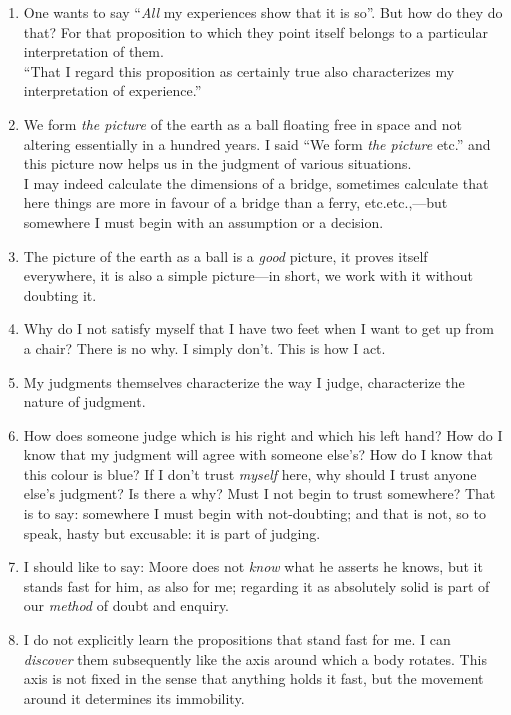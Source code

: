 \documentclass{book}
\begin{document}
\begin{enumerate}
\item
One wants to say ``\emph{All} my experiences show that it is so''. But how do
they do that? For that proposition to which they point itself belongs to a
particular interpretation of them. \\
``That I regard this proposition as certainly true also characterizes my
interpretation of experience.''

\item
We form \emph{the picture} of the earth as a ball floating free in space and
not altering essentially in a hundred years. I said ``We form \emph{the
picture} etc.'' and this picture now helps us in the judgment of various
situations. \\
I may indeed calculate the dimensions of a bridge, sometimes calculate that
here things are more in favour of a bridge than a ferry, etc.etc.,---but
somewhere I must begin with an assumption or a decision.

\item
The picture of the earth as a ball is a \emph{good} picture, it proves itself
everywhere, it is also a simple picture---in short, we work with it without
doubting it.

\item
Why do I not satisfy myself that I have two feet when I want to get up from a
chair? There is no why. I simply don't. This is how I act.

\item
My judgments themselves characterize the way I judge, characterize the nature
of judgment.

\item
How does someone judge which is his right and which his left hand? How do I
know that my judgment will agree with someone else's? How do I know that this
colour is blue? If I don't trust \emph{myself} here, why should I trust anyone
else's judgment? Is there a why? Must I not begin to trust somewhere? That is
to say: somewhere I must begin with not-doubting; and that is not, so to speak,
hasty but excusable: it is part of judging.

\item
I should like to say: Moore does not \emph{know} what he asserts he knows, but
it stands fast for him, as also for me; regarding it as absolutely solid is
part of our \emph{method} of doubt and enquiry.

\item
I do not explicitly learn the propositions that stand fast for me. I can
\emph{discover} them subsequently like the axis around which a body rotates.
This axis is not fixed in the sense that anything holds it fast, but the
movement around it determines its immobility.


\end{enumerate}
\end{document}
